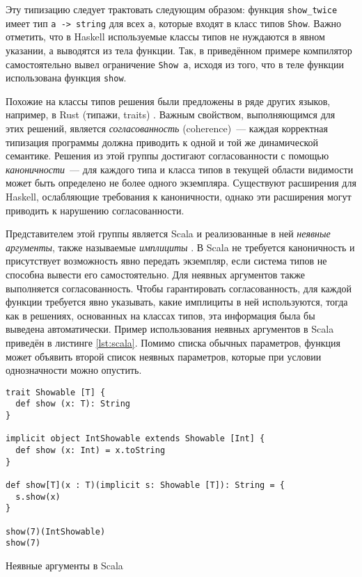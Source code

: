 \documentclass[../diploma.tex]{subfiles}
\begin{document}
Эту типизацию следует трактовать следующим образом: функция \texttt{show_twice} имеет тип \texttt{a -> string} для всех \texttt{a}, которые входят в класс типов \texttt{Show}. Важно отметить, что в Haskell используемые классы типов не нуждаются в явном указании, а выводятся из тела функции. Так, в приведённом примере компилятор самостоятельно вывел ограничение \texttt{Show a}, исходя из того, что в теле функции использована функция \texttt{show}.

Похожие на классы типов решения были предложены в ряде других языков, например, в Rust (типажи, traits) \cite{rust}. Важным свойством, выполняющимся для этих решений, является \textit{согласованность} (coherence)~--- каждая корректная типизация программы должна приводить к одной и той же динамической семантике. Решения из этой группы достигают согласованности с помощью \textit{каноничности}~--- для каждого типа и класса типов в текущей области видимости может быть определено не более одного экземпляра. Существуют расширения для Haskell, ослабляющие требования к каноничности, однако эти расширения могут приводить к нарушению согласованности.

Представителем этой группы является Scala и реализованные в ней \textit{неявные аргументы}, также называемые \textit{имплициты} \cite{implicits}. В Scala не требуется каноничность и присутствует возможность явно передать экземпляр, если система типов не способна вывести его самостоятельно. Для неявных аргументов также выполняется согласованность. Чтобы гарантировать согласованность, для каждой функции требуется явно указывать, какие имплициты в ней используются, тогда как в решениях, основанных на классах типов, эта информация была бы выведена автоматически. Пример использования неявных аргументов в Scala приведён в листинге \ref{lst:scala}. Помимо списка обычных параметров, функция может объявить второй список неявных параметров, которые при условии однозначности можно опустить.

\begin{listing}[H]
\begin{verbatim}
trait Showable [T] { 
  def show (x: T): String
}

implicit object IntShowable extends Showable [Int] {
  def show (x: Int) = x.toString
}

def show[T](x : T)(implicit s: Showable [T]): String = {
  s.show(x)
}

show(7)(IntShowable)
show(7)
\end{verbatim}
\caption{Неявные аргументы в Scala}
\label{lst:scala}
\end{listing}
\end{document}
